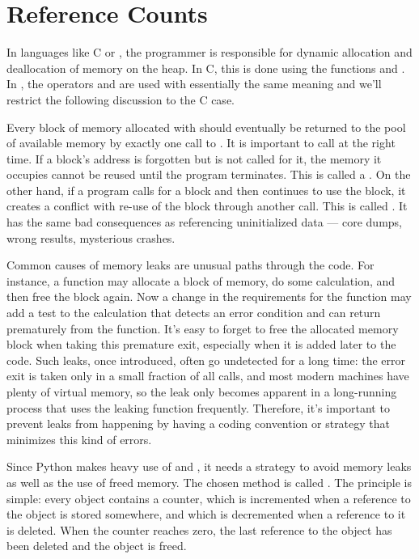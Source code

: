 \section{Reference Counts
         \label{refcounts}}

In languages like C or \Cpp, the programmer is responsible for
dynamic allocation and deallocation of memory on the heap.  In C,
this is done using the functions  and
.  In \Cpp, the operators  and
 are used with essentially the same meaning and
we'll restrict the following discussion to the C case.

Every block of memory allocated with  should
eventually be returned to the pool of available memory by exactly one
call to .  It is important to call
 at the right time.  If a block's address is
forgotten but  is not called for it, the memory it
occupies cannot be reused until the program terminates.  This is
called a .  On the other hand, if a program calls
 for a block and then continues to use the block, it
creates a conflict with re-use of the block through another
 call.  This is called .
It has the same bad consequences as referencing uninitialized data ---
core dumps, wrong results, mysterious crashes.

Common causes of memory leaks are unusual paths through the code.  For
instance, a function may allocate a block of memory, do some
calculation, and then free the block again.  Now a change in the
requirements for the function may add a test to the calculation that
detects an error condition and can return prematurely from the
function.  It's easy to forget to free the allocated memory block when
taking this premature exit, especially when it is added later to the
code.  Such leaks, once introduced, often go undetected for a long
time: the error exit is taken only in a small fraction of all calls,
and most modern machines have plenty of virtual memory, so the leak
only becomes apparent in a long-running process that uses the leaking
function frequently.  Therefore, it's important to prevent leaks from
happening by having a coding convention or strategy that minimizes
this kind of errors.

Since Python makes heavy use of  and
, it needs a strategy to avoid memory leaks as well
as the use of freed memory.  The chosen method is called
.  The principle is simple: every object
contains a counter, which is incremented when a reference to the
object is stored somewhere, and which is decremented when a reference
to it is deleted.  When the counter reaches zero, the last reference
to the object has been deleted and the object is freed.

